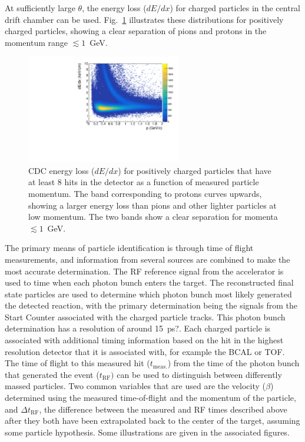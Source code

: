 At sufficiently large $\theta$, the energy loss ($dE/dx$) for charged particles in the central drift chamber can be used.   Fig.~\ref{fig:performcdcdedx} illustrates these distributions for positively charged particles, showing a clear separation of pions and protons in the momentum range $\lesssim 1$~GeV. %

\begin{figure}[tbp]
\begin{center}
\includegraphics[width=0.6\textwidth]{figures/cdc_pos_dedx.pdf}
\caption{\label{fig:performcdcdedx}
CDC energy loss ($dE/dx$) for positively charged particles that have at least 8 hits in the detector as a function of measured particle momentum.  The band corresponding to protons curves upwards, showing a larger energy loss than pions and other lighter particles at low momentum.  The two bands show a clear separation for momenta  $\lesssim 1$~GeV.
}
\end{center}
\end{figure}

The primary means of particle identification is through time of flight measurements, and information from several sources are combined to make the most accurate determination.  The RF reference signal from the accelerator is used to time when each photon bunch enters the target.  The reconstructed final state particles are used to determine which photon bunch most likely generated the detected reaction, with the primary determination being the signals from the Start Counter associated with the charged particle tracks.  This photon bunch determination has a resolution of around 15~ps?. Each charged particle is associated with additional timing information based on the hit in the highest resolution detector that it is associated with, for example the BCAL or TOF.  The time of flight to this measured hit ($t_\mathrm{meas.}$) from the time of the photon bunch that generated the event ($t_\mathrm{RF})$ can be used to distinguish between differently massed particles.  Two common variables that are used are the velocity ($\beta$) determined using the measured time-of-flight and the momentum of the particle, and $\Delta t_\mathrm{RF}$, the difference between the measured and RF times described above after they both have been extrapolated back to the center of the target, assuming some particle hypothesis.
Some illustrations are given in the associated figures.

